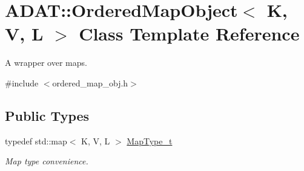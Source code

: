 \hypertarget{classADAT_1_1OrderedMapObject}{}\section{A\+D\+AT\+:\+:Ordered\+Map\+Object$<$ K, V, L $>$ Class Template Reference}
\label{classADAT_1_1OrderedMapObject}


A wrapper over maps.  




{\ttfamily \#include $<$ordered\+\_\+map\+\_\+obj.\+h$>$}

\subsection*{Public Types}
\begin{DoxyCompactItemize}
\item 
typedef std\+::map$<$ K, V, L $>$ \mbox{\hyperlink{classADAT_1_1OrderedMapObject_a4341262d590e4628319a61210534ab88}{Map\+Type\+\_\+t}}
\begin{DoxyCompactList}\small\item\em Map type convenience. \end{DoxyCompactList}\end{DoxyCompactItemize}
